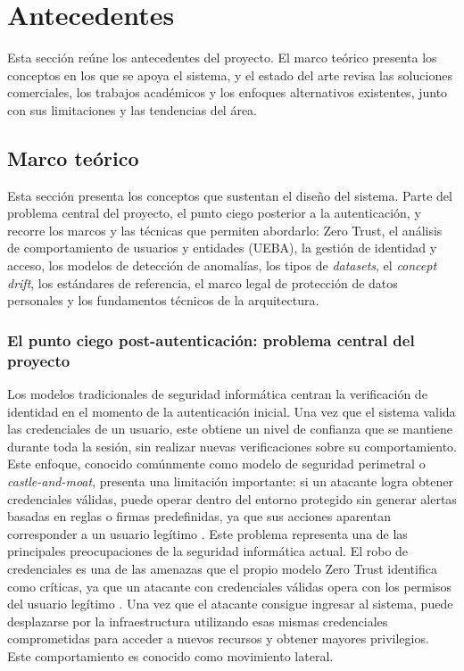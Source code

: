 \chapter{Antecedentes}\label{chap:antecedentes}

Esta sección reúne los antecedentes del proyecto. El marco teórico presenta los conceptos en los que se apoya el sistema, y el estado del arte revisa las soluciones comerciales, los trabajos académicos y los enfoques alternativos existentes, junto con sus limitaciones y las tendencias del área.

\section{Marco teórico}

Esta sección presenta los conceptos que sustentan el diseño del sistema. Parte del problema central del proyecto, el punto ciego posterior a la autenticación, y recorre los marcos y las técnicas que permiten abordarlo: Zero Trust, el análisis de comportamiento de usuarios y entidades (UEBA), la gestión de identidad y acceso, los modelos de detección de anomalías, los tipos de \emph{datasets}, el \emph{concept drift}, los estándares de referencia, el marco legal de protección de datos personales y los fundamentos técnicos de la arquitectura.

\subsection{El punto ciego post-autenticación: problema central del proyecto}
\label{sec:punto-ciego}
Los modelos tradicionales de seguridad informática centran la verificación de identidad en el momento de la autenticación inicial. Una vez que el sistema valida las credenciales de un usuario, este obtiene un nivel de confianza que se mantiene durante toda la sesión, sin realizar nuevas verificaciones sobre su comportamiento. Este enfoque, conocido comúnmente como modelo de seguridad perimetral o \emph{castle-and-moat}, presenta una limitación importante: si un atacante logra obtener credenciales válidas, puede operar dentro del entorno protegido sin generar alertas basadas en reglas o firmas predefinidas, ya que sus acciones aparentan corresponder a un usuario legítimo \parencite{Rose2020}. 
Este problema representa una de las principales preocupaciones de la seguridad informática actual. El robo de credenciales es una de las amenazas que el propio modelo Zero Trust identifica como críticas, ya que un atacante con credenciales válidas opera con los permisos del usuario legítimo \parencite{Rose2020}. Una vez que el atacante consigue ingresar al sistema, puede desplazarse por la infraestructura utilizando esas mismas credenciales comprometidas para acceder a nuevos recursos y obtener mayores privilegios. Este comportamiento es conocido como movimiento lateral.

